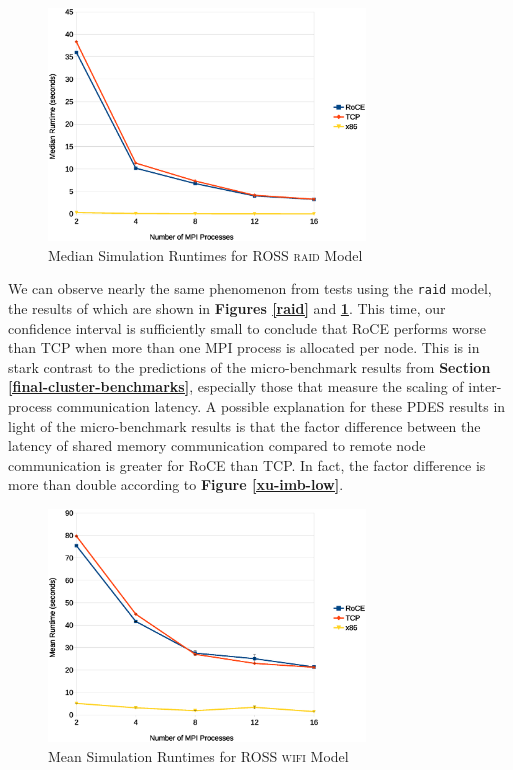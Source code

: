 \documentclass[11pt]{book}
\begin{document}
\begin{figure}
\centering
\includegraphics[width=0.75\textwidth]{raid_median}
\caption{Median Simulation Runtimes for ROSS \textsc{raid} Model}
\label{raid-median}
\end{figure}

We can observe nearly the same phenomenon from tests using the \verb;raid;
model, the results of which are shown in \textbf{Figures \ref{raid}} and
\textbf{\ref{raid-median}}. This time, our confidence interval is sufficiently
small to conclude that RoCE performs worse than TCP when more than one MPI
process is allocated per node. This is in stark contrast to the predictions of
the micro-benchmark results from \textbf{Section
  \ref{final-cluster-benchmarks}}, especially those that measure the scaling of
inter-process communication latency. A possible explanation for these PDES
results in light of the micro-benchmark results is that the factor difference
between the latency of shared memory communication compared to remote node
communication is greater for RoCE than TCP. In fact, the factor difference is
more than double according to \textbf{Figure \ref{xu-imb-low}}.

\begin{figure}
\centering
\includegraphics[width=0.75\textwidth]{wifi}
\caption{Mean Simulation Runtimes for ROSS \textsc{wifi} Model}
\label{wifi}
\end{figure}
\end{document}

